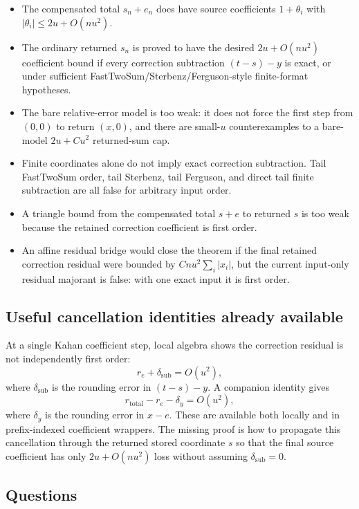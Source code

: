 \documentclass{article}
\begin{document}
\begin{itemize}
\item The compensated total $s_n+e_n$ does have source coefficients
  $1+\theta_i$ with $|\theta_i|\le 2u+O(nu^2)$.
\item The ordinary returned $s_n$ is proved to have the desired
  $2u+O(nu^2)$ coefficient bound if every correction subtraction
  $(t-s)-y$ is exact, or under sufficient FastTwoSum/Sterbenz/Ferguson-style
  finite-format hypotheses.
\item The bare relative-error model is too weak: it does not force the first
  step from $(0,0)$ to return $(x,0)$, and there are small-$u$ counterexamples
  to a bare-model $2u+C u^2$ returned-sum cap.
\item Finite coordinates alone do not imply exact correction subtraction.
  Tail FastTwoSum order, tail Sterbenz, tail Ferguson, and direct tail finite
  subtraction are all false for arbitrary input order.
\item A triangle bound from the compensated total $s+e$ to returned $s$ is too
  weak because the retained correction coefficient is first order.
\item An affine residual bridge would close the theorem if the final retained
  correction residual were bounded by $Cnu^2\sum_i |x_i|$, but the current
  input-only residual majorant is false: with one exact input it is first order.
\end{itemize}

\subsection*{Useful cancellation identities already available}

At a single Kahan coefficient step, local algebra shows the correction residual
is not independently first order:
\[
  r_e+\delta_{\mathrm{sub}}=O(u^2),
\]
where $\delta_{\mathrm{sub}}$ is the rounding error in $(t-s)-y$.  A companion
identity gives
\[
  r_{\mathrm{total}}-r_e-\delta_y=O(u^2),
\]
where $\delta_y$ is the rounding error in $x-e$.  These are available both
locally and in prefix-indexed coefficient wrappers.  The missing proof is how
to propagate this cancellation through the returned stored coordinate $s$ so
that the final source coefficient has only $2u+O(nu^2)$ loss without assuming
$\delta_{\mathrm{sub}}=0$.

\subsection*{Questions}
\end{document}
